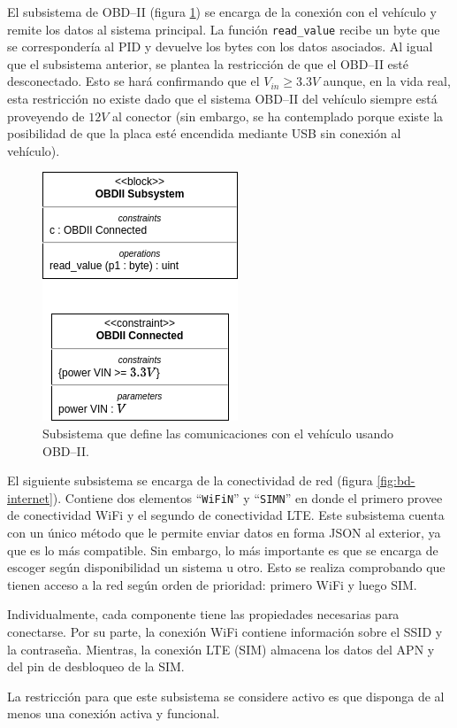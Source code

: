 El subsistema de \ac{OBD}--II (figura \ref{fig:bd-obd}) se encarga de la conexión con
el vehículo y remite los datos al sistema principal. La función \texttt{read\_value}
recibe un byte que se correspondería al \ac{PID} y devuelve los bytes con los datos
asociados. Al igual que el subsistema anterior, se plantea la restricción de que
el \ac{OBD}--II esté desconectado. Esto se hará confirmando que el $V_{in} \ge 3.3V$
aunque, en la vida real, esta restricción no existe dado que el sistema \ac{OBD}--II
del vehículo siempre está proveyendo de $12V$ al conector (sin embargo, se ha contemplado
porque existe la posibilidad de que la placa esté encendida mediante USB sin
conexión al vehículo).

\begin{figure}[H]
  \centering
  \includegraphics[width=.3\linewidth]{images/BD-OBD.png}
  \caption{Subsistema que define las comunicaciones con el vehículo usando \ac{OBD}--II.}
  \label{fig:bd-obd}
\end{figure}

El siguiente subsistema se encarga de la conectividad de red (figura \ref{fig:bd-internet}).
Contiene dos elementos ``\texttt{WiFiN}'' y ``\texttt{SIMN}'' en donde el primero
provee de conectividad WiFi y el segundo de conectividad \ac{LTE}. Este subsistema
cuenta con un único método que le permite enviar datos en forma JSON al exterior,
ya que es lo más compatible. Sin embargo, lo más importante es que se encarga de
escoger según disponibilidad un sistema u otro. Esto se realiza comprobando que
tienen acceso a la red según orden de prioridad: primero WiFi y luego SIM.

Individualmente, cada componente tiene las propiedades necesarias para conectarse.
Por su parte, la conexión WiFi contiene información sobre el SSID y la contraseña.
Mientras, la conexión \ac{LTE} (SIM) almacena los datos del APN y del pin de
desbloqueo de la SIM.

La restricción para que este subsistema se considere activo es que disponga de al
menos una conexión activa y funcional.

